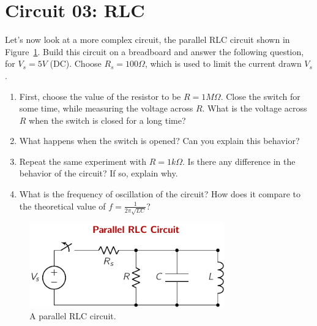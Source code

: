 \section{Circuit 03: RLC}
Let's now look at a more complex circuit, the parallel RLC circuit shown in Figure~\ref{fig:expt01-03}. Build this circuit on a breadboard and answer the following question, for $V_s = 5V$ (DC). Choose $R_s = 100\Omega$, which is used to limit the current drawn $V_s$.
\begin{enumerate}
    \item First, choose the value of the resistor to be $R = 1M\Omega$. Close the switch for some time, while measuring the voltage across $R$. What is the voltage across $R$ when the switch is closed for a long time?
    \item What happens when the switch is opened? Can you explain this behavior?
    \item Repeat the same experiment with $R=1k\Omega$. Is there any difference in the behavior of the circuit? If so, explain why.
    \item What is the frequency of oscillation of the circuit? How does it compare to the theoretical value of $f = \frac{1}{2\pi\sqrt{LC}}$?
\end{enumerate}
\begin{figure}[htbp]
    \centering
    \includegraphics[width=0.75\textwidth]{figures/expt01/expt01-03.pdf}
    \caption{A parallel RLC circuit.}
    \label{fig:expt01-03}
\end{figure}

